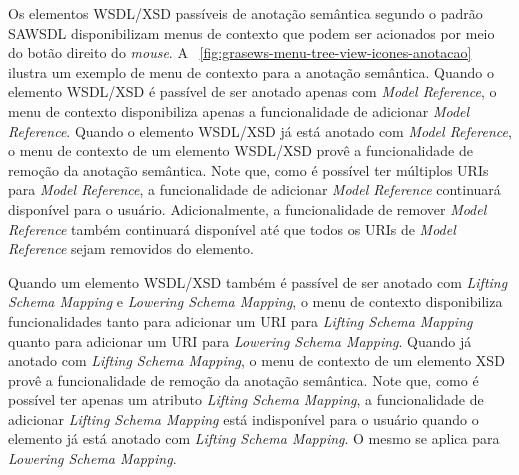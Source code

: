 Os elementos WSDL/XSD passíveis de anotação semântica segundo o padrão SAWSDL disponibilizam menus de contexto que podem ser acionados por meio do botão direito do \textit{mouse}. A \figurename~\ref{fig:grasews-menu-tree-view-icones-anotacao} ilustra um exemplo de menu de contexto para a anotação semântica. Quando o elemento WSDL/XSD é passível de ser anotado apenas com \textit{Model Reference}, o menu de contexto disponibiliza apenas a funcionalidade de adicionar \textit{Model Reference}. Quando o elemento WSDL/XSD já está anotado com \textit{Model Reference}, o menu de contexto de um elemento WSDL/XSD provê a funcionalidade de remoção da anotação semântica. Note que, como é possível ter múltiplos URIs para \textit{Model Reference}, a funcionalidade de adicionar \textit{Model Reference} continuará disponível para o usuário. Adicionalmente, a funcionalidade de remover \textit{Model Reference} também continuará disponível até que todos os URIs de \textit{Model Reference} sejam removidos do elemento.

Quando um elemento WSDL/XSD também é passível de ser anotado com \textit{Lifting Schema Mapping} e \textit{Lowering Schema Mapping}, o menu de contexto disponibiliza funcionalidades tanto para adicionar um URI para \textit{Lifting Schema Mapping} quanto para adicionar um URI para \textit{Lowering Schema Mapping}. Quando já anotado com \textit{Lifting Schema Mapping}, o menu de contexto de um elemento XSD provê a funcionalidade de remoção da anotação semântica. Note que, como é possível ter apenas um atributo \textit{Lifting Schema Mapping}, a funcionalidade de adicionar \textit{Lifting Schema Mapping} está indisponível para o usuário quando o elemento já está anotado com \textit{Lifting Schema Mapping}. O mesmo se aplica para \textit{Lowering Schema Mapping}.